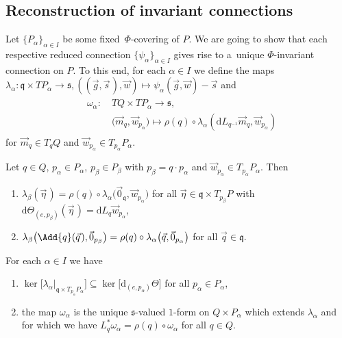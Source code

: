 \subsection{Reconstruction of invariant connections}\label{subsec:Reconstruc}

Let $\{P_\alpha\}_{\alpha\in I}$ be some fixed~$\Phi$-covering of $P$.
We are going to show that each respective reduced connection $\{\psi_\alpha\}_{\alpha\in I}$ gives rise to a~unique
$\Phi$-invariant connection on $P$.
To this end, for each $\alpha\in I$ we def\/ine the maps $\lambda_\alpha\colon \mathfrak{q}\times TP_\alpha\rightarrow
\mathfrak{s}, ((\vec{g},\vec{s}\hspace{1pt}),\vec{w})\mapsto\psi_\alpha(\vec{g},\vec{w})-\vec{s}$ and
\begin{gather*}
\begin{split}
&\omega_\alpha\colon\quad TQ\times TP_\alpha  \rightarrow  \mathfrak{s},
\\
&\phantom{\omega_\alpha\colon\quad {}}
\big(\vec{m}_q,\vec{w}_{p_\alpha}\big) \mapsto  \rho(q)\circ \lambda_\alpha\left(\mathrm{d}
L_{q^{-1}}\vec{m}_q,\vec{w}_{p_\alpha}\right)
\end{split}
\end{gather*}
for $\vec{m}_q\in T_qQ$ and $\vec{w}_{p_\alpha}\in T_{p_\alpha}P_\alpha$.

\begin{Lemma}
\label{lemma:lambda}
Let $q\in Q$, $p_\alpha\in P_\alpha$, $p_\beta\in P_\beta$ with $p_\beta=q\cdot p_\alpha$ and $\vec{w}_{p_\alpha}\in
T_{p_\alpha}P_\alpha$.
Then
\begin{enumerate}\itemsep=0pt
\item[$1)$]
$\lambda_\beta(\vec{\eta}\hspace{1pt})=\rho(q)\circ \lambda_\alpha\big(\vec{0}_{\mathfrak{q}},\vec{w}_{p_\alpha}\big)$ for all
$\vec{\eta}\in \mathfrak{q}\times T_{p_\beta}P$ with $\mathrm{d}\Theta_{(e,p_\beta)}(\vec{\eta}\hspace{1pt})=\mathrm{d}
L_q\vec{w}_{p_\alpha}$,
\item[$2)$]
$\lambda_\beta\big(\Add{q}(\vec{q}\hspace{1pt}),\vec{0}_{p_\beta}\big)=\rho(q)\circ
\lambda_\alpha\big(\vec{q},\vec{0}_{p_\alpha}\big)$ for all $\vec{q}\in \mathfrak{q}$.
\end{enumerate}
For each $\alpha \in I$ we have
\begin{enumerate}\itemsep=0pt
\item[$3)$] $\ker\big[\lambda_\alpha|_{\mathfrak{q}\times T_{p_\alpha}P_\alpha}\big]\subseteq
\ker\big[\mathrm{d}_{(e,p_\alpha)}\Theta\big]$ for all $p_\alpha\in P_\alpha$,
\item[$4)$] the map $\omega_\alpha$ is
the unique $\mathfrak{s}$-valued $1$-form on $Q\times P_\alpha$ which extends $\lambda_\alpha$ and for which we have
$L_q^{*}\omega_\alpha=\rho(q)\circ \omega_\alpha$ for all $q\in Q$.
\end{enumerate}
\end{Lemma}

